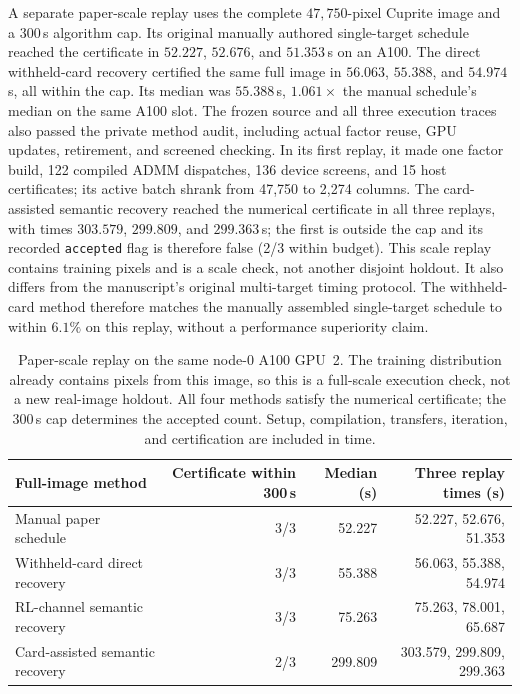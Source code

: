 A separate paper-scale replay uses the complete $47{,}750$-pixel Cuprite image
and a $300$\,s algorithm cap. Its original manually authored single-target
schedule reached the certificate in $52.227$, $52.676$, and $51.353$\,s on an
A100. The direct withheld-card recovery certified the same full image in
$56.063$, $55.388$, and $54.974$\,s, all within the cap. Its median was
$55.388$\,s, $1.061\times$ the manual schedule's median on the same A100 slot.
The frozen source and all three execution traces also passed the private
method audit, including actual factor reuse, GPU updates, retirement, and
screened checking.
In its first replay, it made one factor build, 122 compiled ADMM dispatches,
136 device screens, and 15 host certificates; its active batch shrank from
47,750 to 2,274 columns. The card-assisted semantic recovery reached the
numerical certificate in all three replays, with times $303.579$, $299.809$,
and $299.363$\,s; the first is outside the cap and its recorded
\texttt{accepted} flag is therefore false (2/3 within budget). This scale
replay contains training pixels and is a scale check, not another disjoint
holdout. It also differs from the manuscript's original multi-target timing
protocol. The withheld-card method therefore matches the manually assembled
single-target schedule to within $6.1\%$ on this replay, without a performance
superiority claim.

\begin{table}[t]
\centering\small
\begin{tabular}{lrrr}
\toprule
Full-image method & Certificate within 300\,s & Median (s) & Three replay times (s) \\
\midrule
Manual paper schedule & 3/3 & 52.227 & 52.227, 52.676, 51.353 \\
Withheld-card direct recovery & 3/3 & 55.388 & 56.063, 55.388, 54.974 \\
RL-channel semantic recovery & 3/3 & 75.263 & 75.263, 78.001, 65.687 \\
Card-assisted semantic recovery & 2/3 & 299.809 & 303.579, 299.809, 299.363 \\
\bottomrule
\end{tabular}
\caption{Paper-scale replay on the same node-0 A100 GPU~2. The training
distribution already contains pixels from this image, so this is a full-scale
execution check, not a new real-image holdout. All four methods satisfy the
numerical certificate; the 300\,s cap determines the accepted count. Setup,
compilation, transfers, iteration, and certification are included in time.}
\label{tab:llm-loop-fullimage}
\end{table}

